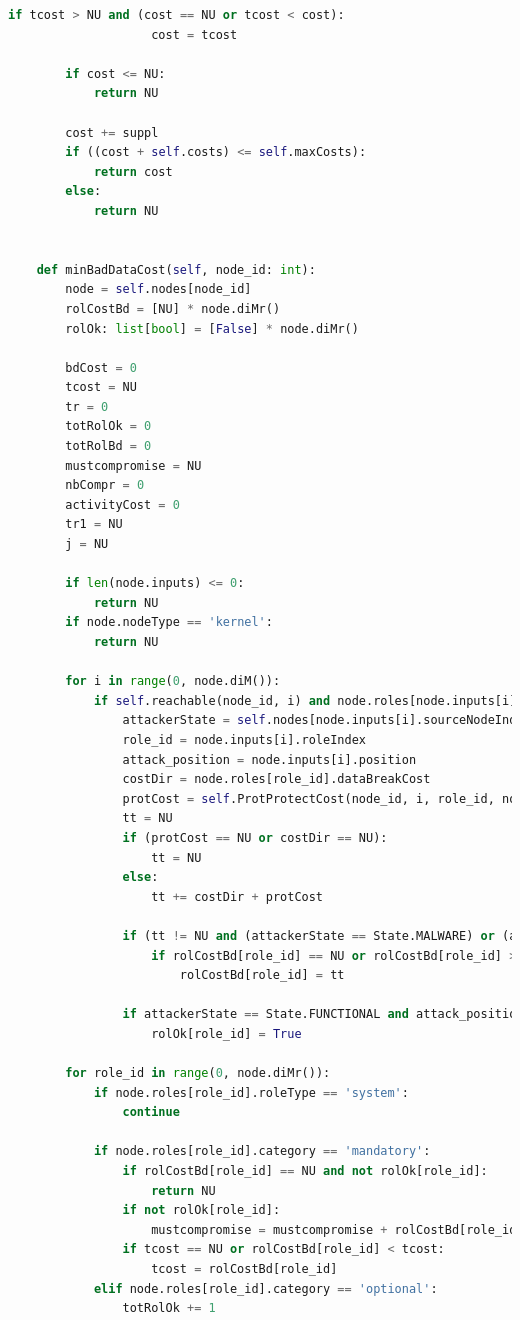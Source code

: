 \documentclass[a4paper]{article}
\begin{document}
\begin{appendices}
\begin{lstlisting}[language=python]
                if tcost > NU and (cost == NU or tcost < cost):
                    cost = tcost
            
        if cost <= NU:
            return NU

        cost += suppl
        if ((cost + self.costs) <= self.maxCosts):
            return cost
        else:
            return NU


    def minBadDataCost(self, node_id: int):
        node = self.nodes[node_id]
        rolCostBd = [NU] * node.diMr()
        rolOk: list[bool] = [False] * node.diMr()

        bdCost = 0
        tcost = NU
        tr = 0
        totRolOk = 0
        totRolBd = 0
        mustcompromise = NU
        nbCompr = 0
        activityCost = 0
        tr1 = NU
        j = NU

        if len(node.inputs) <= 0:
            return NU
        if node.nodeType == 'kernel':
            return NU

        for i in range(0, node.diM()):
            if self.reachable(node_id, i) and node.roles[node.inputs[i].roleIndex].roleType != 'system' and node.roles[node.inputs[i].roleIndex].category != 'transparent':
                attackerState = self.nodes[node.inputs[i].sourceNodeIndex].current
                role_id = node.inputs[i].roleIndex
                attack_position = node.inputs[i].position
                costDir = node.roles[role_id].dataBreakCost
                protCost = self.ProtProtectCost(node_id, i, role_id, node.inputs[i].sourceNodeIndex, attack_position)
                tt = NU
                if (protCost == NU or costDir == NU):
                    tt = NU
                else:
                    tt += costDir + protCost
                
                if (tt != NU and (attackerState == State.MALWARE) or (attackerState == State.TAINTED and attack_position == 'peer')):
                    if rolCostBd[role_id] == NU or rolCostBd[role_id] > tt:
                        rolCostBd[role_id] = tt

                if attackerState == State.FUNCTIONAL and attack_position == 'peer':
                    rolOk[role_id] = True

        for role_id in range(0, node.diMr()):
            if node.roles[role_id].roleType == 'system':
                continue

            if node.roles[role_id].category == 'mandatory':
                if rolCostBd[role_id] == NU and not rolOk[role_id]:
                    return NU
                if not rolOk[role_id]:
                    mustcompromise = mustcompromise + rolCostBd[role_id] if mustcompromise > NU else rolCostBd[role_id]
                if tcost == NU or rolCostBd[role_id] < tcost:
                    tcost = rolCostBd[role_id]
            elif node.roles[role_id].category == 'optional':
                totRolOk += 1


\end{lstlisting}
\end{appendices}
\end{document}
